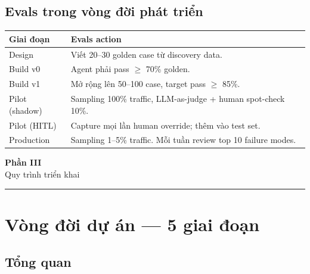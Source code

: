 \documentclass[11pt,a4paper]{article}
\begin{document}
\subsection{Evals trong vòng đời phát triển}

\begin{tabularx}{\linewidth}{@{}p{3cm} X@{}}
\toprule
\textbf{Giai đoạn} & \textbf{Evals action} \\
\midrule
Design & Viết 20--30 golden case từ discovery data. \\
Build v0 & Agent phải pass $\geq$ 70\% golden. \\
Build v1 & Mở rộng lên 50--100 case, target pass $\geq$ 85\%. \\
Pilot (shadow) & Sampling 100\% traffic, LLM-as-judge + human spot-check 10\%. \\
Pilot (HITL) & Capture mọi lần human override; thêm vào test set. \\
Production & Sampling 1--5\% traffic. Mỗi tuần review top 10 failure modes. \\
\bottomrule
\end{tabularx}

\clearpage

\begin{center}
\vspace*{0.5em}
{\sffamily\bfseries\Huge\color{ink} Phần III}\\[0.5em]
{\sffamily\LARGE\color{mid} Quy trình triển khai}\\[0.5em]
{\color{mid}\rule{6cm}{0.4pt}}
\end{center}
\vspace{1em}

\section{Vòng đời dự án --- 5 giai đoạn}

\subsection{Tổng quan}
\end{document}
